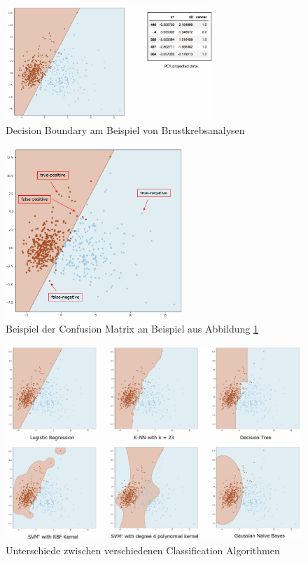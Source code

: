 \documentclass[a4paper]{article}
\begin{document}
		\begin{figure}[htb!]
			\centering
			\includegraphics[width=0.7\textwidth]{img/04_supervised_ml/example_decision_boundary.png}
			\caption{Decision Boundary am Beispiel von Brustkrebsanalysen}
			\label{fig:04_superv_ml_example_decision_boundary}
		\end{figure}
	
		\newpage
	
		\begin{figure}[htb!]
			\centering
			\includegraphics[width=0.6\textwidth]{img/04_supervised_ml/example_confusion_matrix.png}
			\caption{Beispiel der Confusion Matrix an Beispiel aus Abbildung \ref{fig:04_superv_ml_example_decision_boundary}}
			\label{fig:04_superv_ml_example_confusion_matrix}
		\end{figure}
	
		\begin{figure}[htb!]
			\centering
			\includegraphics[width=\textwidth]{img/04_supervised_ml/example_class_algos.png}
			\caption{Unterschiede zwischen verschiedenen Classification Algorithmen}
			\label{fig:04_superv_ml_example_class_algos}
		\end{figure}
		
\end{document}
